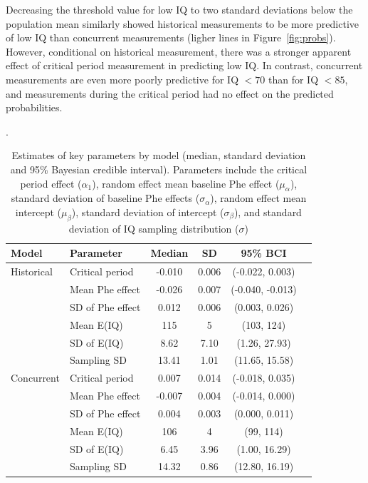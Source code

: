 \documentclass{svjour3}                     %
\begin{document}
Decreasing the threshold value for low IQ to two standard deviations below the population mean similarly showed historical measurements to be more predictive of low IQ than concurrent measurements (ligher lines in Figure~\ref{fig:probs}). However, conditional on historical measurement, there was a stronger apparent effect of critical period measurement in predicting low IQ. In contrast, concurrent measurements are even more poorly predictive for IQ $<70$ than for IQ $<85$, and measurements during the critical period had no effect on the predicted probabilities.

\begin{table}[p]
    \caption{Estimates of key parameters by model (median, standard deviation and 95\% Bayesian credible interval). Parameters include the critical period effect ($\alpha_1$), random effect mean baseline Phe effect ($\mu_{\alpha}$), standard deviation of baseline Phe effects ($\sigma_{\alpha}$), random effect mean intercept ($\mu_{\beta}$), standard deviation of intercept ($\sigma_{\beta}$), and standard deviation of IQ sampling distribution ($\sigma$)}. \label{tab:params}
    \begin{tabular}{llcccc}
    \hline
    Model & Parameter & Median & SD & 95\% BCI \\
    \hline
    Historical & Critical period & -0.010 & 0.006 & (-0.022, 0.003)\\
    & Mean Phe effect & -0.026 & 0.007 & (-0.040, -0.013)\\
    & SD of Phe effect & 0.012 & 0.006 & (0.003, 0.026)\\
    & Mean E(IQ) & 115 & 5 & (103, 124)\\
    & SD of E(IQ) & 8.62 & 7.10 & (1.26, 27.93)\\
    & Sampling SD & 13.41 & 1.01 & (11.65, 15.58)\\
    Concurrent & Critical period & 0.007 & 0.014 & (-0.018, 0.035)\\
    & Mean Phe effect & -0.007 & 0.004 & (-0.014, 0.000)\\
    & SD of Phe effect & 0.004 & 0.003 & (0.000, 0.011)\\
    & Mean E(IQ) & 106 & 4 & (99, 114)\\
    & SD of E(IQ) & 6.45 & 3.96 & (1.00, 16.29)\\
    & Sampling SD & 14.32 & 0.86 & (12.80, 16.19)\\
    \hline
    \end{tabular}
\end{table}
\end{document}
